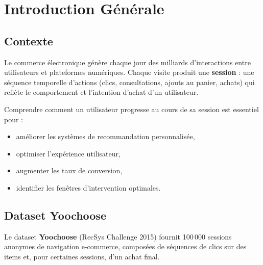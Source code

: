 \documentclass[11pt,a4paper]{article}
\begin{document}
\tableofcontents
\newpage

\section{Introduction Générale}

\subsection{Contexte}

Le commerce électronique génère chaque jour des milliards d'interactions entre utilisateurs
et plateformes numériques. Chaque visite produit une \textbf{session} : une séquence temporelle
d'actions (clics, consultations, ajouts au panier, achats) qui reflète le comportement et
l'intention d'achat d'un utilisateur.

Comprendre comment un utilisateur progresse au cours de sa session est essentiel pour :
\begin{itemize}[leftmargin=2cm,itemsep=2pt]
  \item améliorer les systèmes de recommandation personnalisée,
  \item optimiser l'expérience utilisateur,
  \item augmenter les taux de conversion,
  \item identifier les fenêtres d'intervention optimales.
\end{itemize}

\subsection{Dataset Yoochoose}

Le dataset \textbf{Yoochoose} (RecSys Challenge 2015) fournit 100\,000 sessions anonymes
de navigation e-commerce, composées de séquences de clics sur des items et, pour certaines
sessions, d'un achat final.
\end{document}
